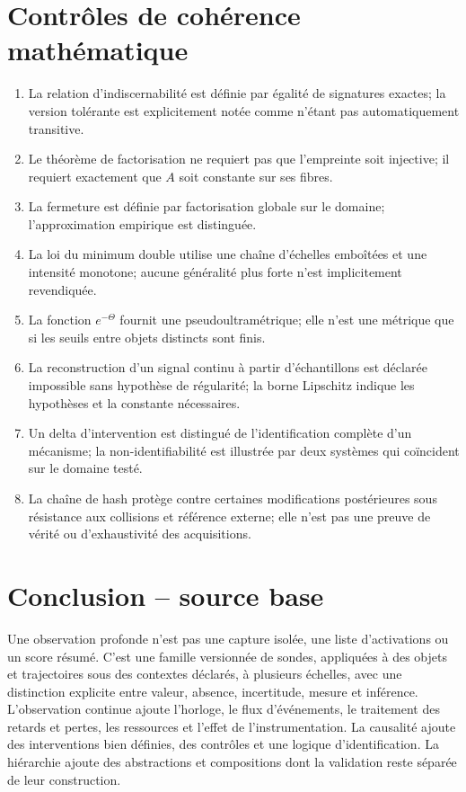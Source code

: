 \documentclass[11pt,oneside]{book}
\theoremstyle{definition}
\theoremstyle{remark}
\newcommand{\1}{\mathbf 1}
\begin{document}
\section*{Contrôles de cohérence mathématique}
\begin{enumerate}
\item La relation d'indiscernabilité est définie par égalité de signatures exactes; la version tolérante est explicitement notée comme n'étant pas automatiquement transitive.
\item Le théorème de factorisation ne requiert pas que l'empreinte soit injective; il requiert exactement que $A$ soit constante sur ses fibres.
\item La fermeture est définie par factorisation globale sur le domaine; l'approximation empirique est distinguée.
\item La loi du minimum double utilise une chaîne d'échelles emboîtées et une intensité monotone; aucune généralité plus forte n'est implicitement revendiquée.
\item La fonction $e^{-\Theta}$ fournit une pseudoultramétrique; elle n'est une métrique que si les seuils entre objets distincts sont finis.
\item La reconstruction d'un signal continu à partir d'échantillons est déclarée impossible sans hypothèse de régularité; la borne Lipschitz indique les hypothèses et la constante nécessaires.
\item Un delta d'intervention est distingué de l'identification complète d'un mécanisme; la non-identifiabilité est illustrée par deux systèmes qui coïncident sur le domaine testé.
\item La chaîne de hash protège contre certaines modifications postérieures sous résistance aux collisions et référence externe; elle n'est pas une preuve de vérité ou d'exhaustivité des acquisitions.
\end{enumerate}

\backmatter

\section*{Conclusion -- source base}
Une observation profonde n'est pas une capture isolée, une liste d'activations ou un score résumé. C'est une famille versionnée de sondes, appliquées à des objets et trajectoires sous des contextes déclarés, à plusieurs échelles, avec une distinction explicite entre valeur, absence, incertitude, mesure et inférence. L'observation continue ajoute l'horloge, le flux d'événements, le traitement des retards et pertes, les ressources et l'effet de l'instrumentation. La causalité ajoute des interventions bien définies, des contrôles et une logique d'identification. La hiérarchie ajoute des abstractions et compositions dont la validation reste séparée de leur construction.
\end{document}
